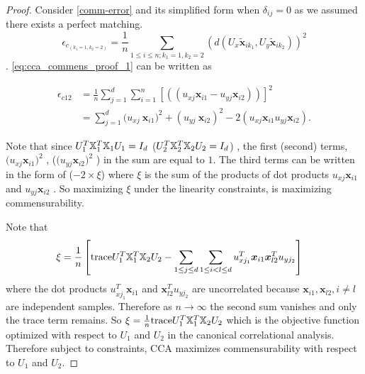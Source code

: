 \documentclass[12pt,oneside,final]{thesis}\usepackage[]{graphicx}\usepackage[]{color}
\begin{document}
\begin{proof}
 Consider \ref{comm-error} and its simplified form when $\delta_{ij}=0$ as we assumed there exists a perfect matching. 
 \[\epsilon_{c_{(k_1=1,k_2=2)}} = \frac{1}{n} \sum_{1 \leq i \leq n;k_1=1,k_2=2} (d(U_x\widetilde{\bm{x}}_{ik_1},U_y \widetilde{\bm{x}}_{ik_2}))^2
\label{eq:cca_commens_proof_1}\]
. \ref{eq:cca_commens_proof_1} can be written as

\begin{align*}
\epsilon_{c12} &=  \frac{1}{n}  \sum_{j=1}^d \sum_{i=1}^n \left[((u_{xj}{\bm{x}}_{i1}-u_{yj} {\bm{x}}_{i2}))\right]^2 \\
&=  \sum_{j=1}^d {(u_{xj}\ {\bm{x}}_{i1}})^2+ ( u_{yj} \ {\bm{x}}_{i2})^2 - 2 (u_{xj}  {\bm{x}}_{i1} u_{yj}  {\bm{x}}_{i2}).
\end{align*}


Note that since $U_1^{T}\mathbb{X}_1^{T}\mathbb{X}_1U_1=I_d$ ($U_2^{T}\mathbb{X}_2^{T}\mathbb{X}_2U_2=I_d$) , the first (second) terms, ${(u_{xj} {\bm{x}}_{i1}})^2  $ , 
(${(u_{yj} {\bm{x}}_{i2}})^2 $ )
in the sum are equal to  $1$. The third terms can be written in the form of  ($ -2 \times \xi$) where $\xi$ is the sum of the products of dot products  $u_{xj}  {\bm{x}}_{i1}$ and  $u_{yj}  {\bm{x}}_{i2}$  . So maximizing $\xi$ under the linearity constraints,  is maximizing  commensurability.


Note that 
\begin{align*}
\xi &=  \frac{1}{n} \left[ \textup{trace}{U_1^{T}\mathbb{X}_1^{T}\mathbb{X}_2U_2} - \sum_{1 \leq j \leq d} \sum_{1 \leq i < l \leq d} u_{xj_1}^T  {\bm{x}}_{i1}  {\bm{x}}_{l2}^T u_{yj_2} \right]
\end{align*}
where the dot products $u_{xj_1}^T  {\bm{x}}_{i1}$ and  $ {\bm{x}}_{l2}^T u_{yj_2}$  are uncorrelated because ${\bm{x}}_{i1},{\bm{x}}_{l2}, i \neq l$  are independent samples. Therefore as $n \rightarrow \infty$ the second sum vanishes and only the trace term remains.  
So $\xi= \frac{1}{n}\textup{trace}{U_1^{T}\mathbb{X}_1^{T}\mathbb{X}_2U_2}$ which is the objective function optimized with respect to $U_1$ and $U_2$ in the canonical correlational analysis. Therefore subject to constraints, CCA maximizes commensurability  with respect to $U_1$ and $U_2$.

\end{proof}
\end{document}
